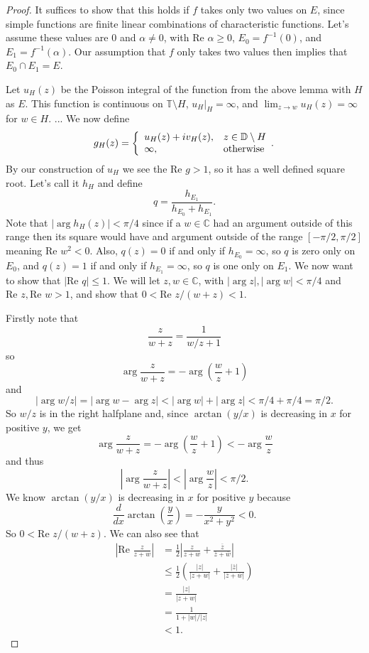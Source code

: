\documentclass[a4paper,12pt,twoside,BCOR=10mm]{scrbook}
\renewcommand{\Re}{\text{Re }}
\begin{document}
\begin{proof}
It suffices to show that this holds if $f$ takes only two values on $E$, since simple functions are finite linear combinations of characteristic functions.
Let's assume these values are $0$ and $\alpha \neq 0$, with $\Re \alpha \geq 0$, $E_0 = f^{-1}(0)$, and $E_1 = f^{-1}(\alpha)$.
Our assumption that $f$ only takes two values then implies that $E_0 \cap E_1 = E$.

Let $u_H(z)$ be the Poisson integral of the function from the above lemma with $H$ as $E$. %
This function is continuous on $\mathbb{T} \setminus H$, $u_H|_H = \infty$, and $\lim_{z \rightarrow w} u_H(z) = \infty$ for $w \in H$.
...
We now define
\[
	g_H(z) =
	\left \{
		\begin{array}{l l}
		u_H(z) + iv_H(z), & z \in \mathbb{D} \setminus H\\
		\infty, & \text{otherwise}
		\end{array}.
	\right .
\]
By our construction of $u_H$ we see the $\Re g > 1$, so it has a well defined square root. %
Let's call it $h_H$ and define
\[
	q = \frac{h_{E_1}}{h_{E_0} + h_{E_1}}.
\]
Note that $|\arg h_H(z)| < \pi/4$ since if a $w \in \mathbb{C}$ had an argument outside of this range then its square would have and argument outside of the range $[-\pi/2, \pi/2]$ meaning $\Re w^2 < 0$.
Also, $q(z) = 0$ if and only if $h_{E_0} = \infty$, so $q$ is zero only on $E_0$, and $q(z) = 1$ if and only if $h_{E_1} = \infty$, so $q$ is one only on $E_1$.
We now want to show that $|\Re q| \leq 1$.
We will let $z, w \in \mathbb{C}$, with $|\arg z|, |\arg w| < \pi/4$ and $\Re z, \Re w > 1$, and show that $0 < \Re z/(w + z) < 1$.

Firstly note that
\[
	\frac{z}{w + z}
	=
	\frac{1}{w/z + 1}
\]
so 
\[
	\arg \frac{z}{w + z} = -\arg \left ( \frac{w}{z} + 1 \right )
\]
and
\[
	|\arg w/z| = |\arg w - \arg z| < |\arg w| + |\arg z| < \pi/4 + \pi/4 = \pi/2.
\]
So $w/z$ is in the right halfplane and, since $\arctan(y/x)$ is decreasing in $x$ for positive $y$, we get
\[
	\arg \frac{z}{w + z} = -\arg \left ( \frac{w}{z} + 1 \right ) < -\arg  \frac{w}{z}
\]
and thus
\[
	\left |\arg \frac{z}{w + z} \right | < \left |\arg \frac{w}{z} \right | < \pi/2.
\]
We know $\arctan(y/x)$ is decreasing in $x$ for positive $y$ because
\[
	\frac{d}{dx}\arctan \left (\frac{y}{x} \right ) = -\frac{y}{x^2 + y^2} < 0.
\]
So $0 < \Re z/(w + z)$.
We can also see that
\begin{align*}
	\left | \Re \frac{z}{z + w} \right |
	&= \frac{1}{2} \left | \frac{z}{z + w} + \frac{\overline{z}}{\overline{z} + \overline{w}} \right |\\
	&\leq \frac{1}{2} \left ( \frac{|z|}{|z + w|} + \frac{|\overline{z}|}{|\overline{z} + \overline{w}|} \right )\\
	&= \frac{|z|}{|z + w|}\\
	&= \frac{1}{1 + |w|/|z|}\\
	&< 1.
\end{align*}


\end{proof}
\end{document}
